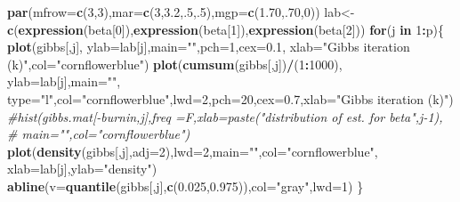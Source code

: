\documentclass[
]{article}
\newenvironment{Shaded}{\begin{snugshade}}{\end{snugshade}}
\newcommand{\CommentTok}[1]{\textcolor[rgb]{0.56,0.35,0.01}{\textit{#1}}}
\newcommand{\ControlFlowTok}[1]{\textcolor[rgb]{0.13,0.29,0.53}{\textbf{#1}}}
\newcommand{\DataTypeTok}[1]{\textcolor[rgb]{0.13,0.29,0.53}{#1}}
\newcommand{\DecValTok}[1]{\textcolor[rgb]{0.00,0.00,0.81}{#1}}
\newcommand{\FloatTok}[1]{\textcolor[rgb]{0.00,0.00,0.81}{#1}}
\newcommand{\KeywordTok}[1]{\textcolor[rgb]{0.13,0.29,0.53}{\textbf{#1}}}
\newcommand{\NormalTok}[1]{#1}
\newcommand{\OperatorTok}[1]{\textcolor[rgb]{0.81,0.36,0.00}{\textbf{#1}}}
\newcommand{\StringTok}[1]{\textcolor[rgb]{0.31,0.60,0.02}{#1}}
\begin{document}
\begin{Shaded}
\begin{Highlighting}[]
\KeywordTok{par}\NormalTok{(}\DataTypeTok{mfrow=}\KeywordTok{c}\NormalTok{(}\DecValTok{3}\NormalTok{,}\DecValTok{3}\NormalTok{),}\DataTypeTok{mar=}\KeywordTok{c}\NormalTok{(}\DecValTok{3}\NormalTok{,}\FloatTok{3.2}\NormalTok{,.}\DecValTok{5}\NormalTok{,.}\DecValTok{5}\NormalTok{),}\DataTypeTok{mgp=}\KeywordTok{c}\NormalTok{(}\FloatTok{1.70}\NormalTok{,.}\DecValTok{70}\NormalTok{,}\DecValTok{0}\NormalTok{))}
\NormalTok{lab<-}\KeywordTok{c}\NormalTok{(}\KeywordTok{expression}\NormalTok{(beta[}\DecValTok{0}\NormalTok{]),}\KeywordTok{expression}\NormalTok{(beta[}\DecValTok{1}\NormalTok{]),}\KeywordTok{expression}\NormalTok{(beta[}\DecValTok{2}\NormalTok{]))}
\ControlFlowTok{for}\NormalTok{(j }\ControlFlowTok{in} \DecValTok{1}\OperatorTok{:}\NormalTok{p)\{}
\KeywordTok{plot}\NormalTok{(gibbs[,j],  }\DataTypeTok{ylab=}\NormalTok{lab[j],}\DataTypeTok{main=}\StringTok{""}\NormalTok{,}\DataTypeTok{pch=}\DecValTok{1}\NormalTok{,}\DataTypeTok{cex=}\FloatTok{0.1}\NormalTok{,}
     \DataTypeTok{xlab=}\StringTok{"Gibbs iteration (k)"}\NormalTok{,}\DataTypeTok{col=}\StringTok{"cornflowerblue"}\NormalTok{)  }
\KeywordTok{plot}\NormalTok{(}\KeywordTok{cumsum}\NormalTok{(gibbs[,j])}\OperatorTok{/}\NormalTok{(}\DecValTok{1}\OperatorTok{:}\DecValTok{1000}\NormalTok{),  }\DataTypeTok{ylab=}\NormalTok{lab[j],}\DataTypeTok{main=}\StringTok{""}\NormalTok{,}
     \DataTypeTok{type=}\StringTok{"l"}\NormalTok{,}\DataTypeTok{col=}\StringTok{"cornflowerblue"}\NormalTok{,}\DataTypeTok{lwd=}\DecValTok{2}\NormalTok{,}\DataTypeTok{pch=}\DecValTok{20}\NormalTok{,}\DataTypeTok{cex=}\FloatTok{0.7}\NormalTok{,}\DataTypeTok{xlab=}\StringTok{"Gibbs iteration (k)"}\NormalTok{)}
\CommentTok{#hist(gibbs.mat[-burnin,j],freq =F,xlab=paste("distribution of est. for beta",j-1),}
\CommentTok{#     main="",col="cornflowerblue")}
\KeywordTok{plot}\NormalTok{(}\KeywordTok{density}\NormalTok{(gibbs[,j],}\DataTypeTok{adj=}\DecValTok{2}\NormalTok{),}\DataTypeTok{lwd=}\DecValTok{2}\NormalTok{,}\DataTypeTok{main=}\StringTok{""}\NormalTok{,}\DataTypeTok{col=}\StringTok{"cornflowerblue"}\NormalTok{,}
    \DataTypeTok{xlab=}\NormalTok{lab[j],}\DataTypeTok{ylab=}\StringTok{"density"}\NormalTok{)}
\KeywordTok{abline}\NormalTok{(}\DataTypeTok{v=}\KeywordTok{quantile}\NormalTok{(gibbs[,j],}\KeywordTok{c}\NormalTok{(}\FloatTok{0.025}\NormalTok{,}\FloatTok{0.975}\NormalTok{)),}\DataTypeTok{col=}\StringTok{"gray"}\NormalTok{,}\DataTypeTok{lwd=}\DecValTok{1}\NormalTok{)}
\NormalTok{\}}
\end{Highlighting}
\end{Shaded}
\end{document}
